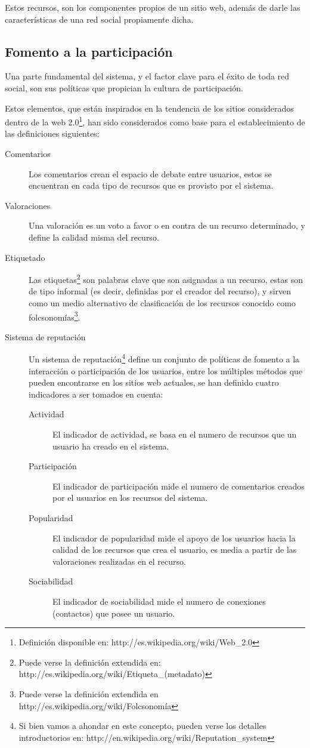 Estos recursos, son los componentes propios de un sitio web, además de darle las
características de una red social propiamente dicha.

\subsection{Fomento a la participación}

Una parte fundamental del sistema, y el factor clave para el éxito de toda red
social, son sus políticas que propician la cultura de participación.

Estos elementos, que están inspirados en la tendencia de los sitios considerados
dentro de la web 2.0\footnote{Definición disponible en:
http://es.wikipedia.org/wiki/Web\_2.0}, han sido considerados como base para el
establecimiento de las definiciones siguientes:

\begin{description}
\item [Comentarios] Los comentarios crean el espacio de debate entre usuarios,
estos se encuentran en cada tipo de recursos que es provisto por el sistema.
\item [Valoraciones] Una valoración es un voto a favor o en contra de un recurso
determinado, y define la calidad misma del recurso.
\item [Etiquetado] Las etiquetas\footnote{Puede verse la definición extendida
en: http://es.wikipedia.org/wiki/Etiqueta\_(metadato)} son palabras clave que
son asignadas a un recurso, estas son de tipo informal (es decir, definidas por
el creador del recurso), y sirven como un medio alternativo de clasificación de
los recursos conocido como folcsonomías\footnote{Puede verse la definición
extendida en http://es.wikipedia.org/wiki/Folcsonomía}.
\item [Sistema de reputación] Un sistema de reputación\footnote{Si bien vamos a
ahondar en este concepto, pueden verse los detalles introductorios en:
http://en.wikipedia.org/wiki/Reputation\_system} define un conjunto de políticas
de fomento a la interacción o participación de los usuarios, entre los múltiples
métodos que pueden encontrarse en los sitios web actuales, se han definido
cuatro indicadores a ser tomados en cuenta:
\begin{description}
    \item [Actividad] El indicador de actividad, se basa en el numero de
    recursos que un usuario ha creado en el sistema.
    \item [Participación] El indicador de participación mide el numero de
    comentarios creados por el usuarios en los recursos del sistema.
    \item [Popularidad] El indicador de popularidad mide el apoyo de los
    usuarios hacia la calidad de los recursos que crea el usuario, es media a
    partir de las valoraciones realizadas en el recurso.
    \item [Sociabilidad] El indicador de sociabilidad mide el numero de
    conexiones (contactos) que posee un usuario.
    \end{description}
\end{description}

